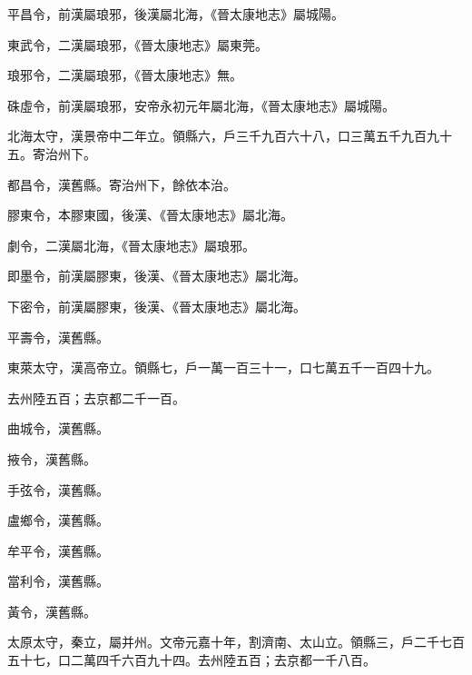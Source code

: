 \begin{pinyinscope}
 平昌令，前漢屬琅邪，後漢屬北海，《晉太康地志》屬城陽。



 東武令，二漢屬琅邪，《晉太康地志》屬東莞。



 琅邪令，二漢屬琅邪，《晉太康地志》無。



 硃虛令，前漢屬琅邪，安帝永初元年屬北海，《晉太康地志》屬城陽。



 北海太守，漢景帝中二年立。領縣六，戶三千九百六十八，口三萬五千九百九十五。寄治州下。



 都昌令，漢舊縣。寄治州下，餘依本治。



 膠東令，本膠東國，後漢、《晉太康地志》屬北海。



 劇令，二漢屬北海，《晉太康地志》屬琅邪。



 即墨令，前漢屬膠東，後漢、《晉太康地志》屬北海。



 下密令，前漢屬膠東，後漢、《晉太康地志》屬北海。



 平壽令，漢舊縣。



 東萊太守，漢高帝立。領縣七，戶一萬一百三十一，口七萬五千一百四十九。



 去州陸五百；去京都二千一百。



 曲城令，漢舊縣。



 掖令，漢舊縣。



 手弦令，漢舊縣。



 盧鄉令，漢舊縣。



 牟平令，漢舊縣。



 當利令，漢舊縣。



 黃令，漢舊縣。



 太原太守，秦立，屬并州。文帝元嘉十年，割濟南、太山立。領縣三，戶二千七百五十七，口二萬四千六百九十四。去州陸五百；去京都一千八百。




\end{pinyinscope}
